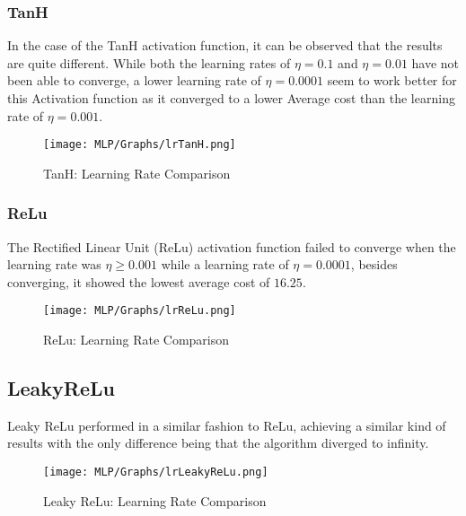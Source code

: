 \documentclass{report}
\begin{document}
\newpage

\subsubsection{TanH}

In the case of the TanH activation function, it can be observed that the results are quite different. While both the learning rates of $\eta = 0.1$ and $\eta = 0.01$ have not been able to converge, a lower learning rate of $\eta = 0.0001$ seem to work better for this Activation function as it converged to a lower Average cost than the learning rate of $\eta= 0.001$.

\begin{center}
\begin{figure}[htp]
\texttt{[image: MLP/Graphs/lrTanH.png]}
\caption{TanH: Learning Rate Comparison}
\label{lrTanH}
\end{figure}
\end{center}

\newpage
\subsubsection{ReLu}

The Rectified Linear Unit (ReLu) activation function failed to converge when the learning rate was $\eta \geq 0.001$ while a learning rate of $\eta = 0.0001$, besides converging, it showed the lowest average cost of $16.25$.
\begin{center}
\begin{figure}[htp]
\texttt{[image: MLP/Graphs/lrReLu.png]}
\caption{ReLu: Learning Rate Comparison}
\label{lrTanH}
\end{figure}
\end{center}

\newpage
\subsection{LeakyReLu}
Leaky ReLu performed in a similar fashion to ReLu, achieving a similar kind of results with the only difference being that the algorithm diverged to infinity.

\begin{center}
\begin{figure}[htp]
\texttt{[image: MLP/Graphs/lrLeakyReLu.png]}
\caption{Leaky ReLu: Learning Rate Comparison}
\label{lrTanH}
\end{figure}
\end{center}
\end{document}
